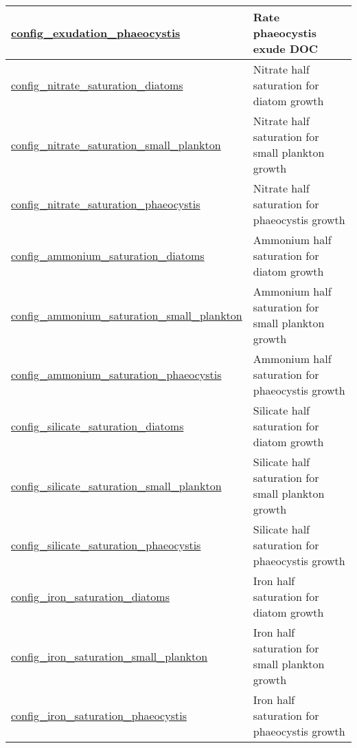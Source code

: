 {\begin{center}
\begin{longtable}{| p{2.0in} || p{4.0in} |}
    \hline
    \hyperref[subsec:nm_sec_config_exudation_phaeocystis]{config\_exudation\_phaeocystis} & Rate phaeocystis exude DOC \\
    \hline
    \hyperref[subsec:nm_sec_config_nitrate_saturation_diatoms]{config\_nitrate\_saturation\_\-diatoms} & Nitrate half saturation for diatom growth \\
    \hline
    \hyperref[subsec:nm_sec_config_nitrate_saturation_small_plankton]{config\_nitrate\_saturation\_\-small\_plankton} & Nitrate half saturation for small plankton growth \\
    \hline
    \hyperref[subsec:nm_sec_config_nitrate_saturation_phaeocystis]{config\_nitrate\_saturation\_\-phaeocystis} & Nitrate half saturation for phaeocystis growth \\
    \hline
    \hyperref[subsec:nm_sec_config_ammonium_saturation_diatoms]{config\_ammonium\_saturation\_\-diatoms} & Ammonium half saturation for diatom growth \\
    \hline
    \hyperref[subsec:nm_sec_config_ammonium_saturation_small_plankton]{config\_ammonium\_saturation\_\-small\_plankton} & Ammonium half saturation for small plankton growth \\
    \hline
    \hyperref[subsec:nm_sec_config_ammonium_saturation_phaeocystis]{config\_ammonium\_saturation\_\-phaeocystis} & Ammonium half saturation for phaeocystis growth \\
    \hline
    \hyperref[subsec:nm_sec_config_silicate_saturation_diatoms]{config\_silicate\_saturation\_\-diatoms} & Silicate half saturation for diatom growth \\
    \hline
    \hyperref[subsec:nm_sec_config_silicate_saturation_small_plankton]{config\_silicate\_saturation\_\-small\_plankton} & Silicate half saturation for small plankton growth \\
    \hline
    \hyperref[subsec:nm_sec_config_silicate_saturation_phaeocystis]{config\_silicate\_saturation\_\-phaeocystis} & Silicate half saturation for phaeocystis growth \\
    \hline
    \hyperref[subsec:nm_sec_config_iron_saturation_diatoms]{config\_iron\_saturation\_diatoms} & Iron half saturation for diatom growth \\
    \hline
    \hyperref[subsec:nm_sec_config_iron_saturation_small_plankton]{config\_iron\_saturation\_small\_\-plankton} & Iron half saturation for small plankton growth \\
    \hline
    \hyperref[subsec:nm_sec_config_iron_saturation_phaeocystis]{config\_iron\_saturation\_\-phaeocystis} & Iron half saturation for phaeocystis growth \\

\end{longtable}
\end{center}}

